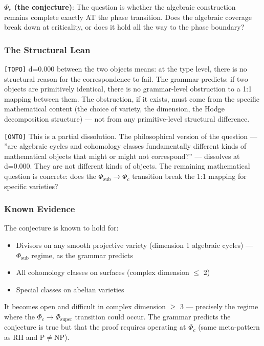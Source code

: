 \documentclass[12pt,a4paper]{article}
\begin{document}
\textbf{$\Phi_c$ (the conjecture)}: The question is whether the algebraic construction remains complete exactly AT the phase transition. Does the algebraic coverage break down at criticality, or does it hold all the way to the phase boundary?

\subsubsection{The Structural Lean}

\texttt{{[}TOPO{]}} d=0.000 between the two objects means: at the type level, there is no structural reason for the correspondence to fail. The grammar predicts: if two objects are primitively identical, there is no grammar-level obstruction to a 1:1 mapping between them. The obstruction, if it exists, must come from the specific mathematical content (the choice of variety, the dimension, the Hodge decomposition structure) --- not from any primitive-level structural difference.

\texttt{{[}ONTO{]}} This is a partial dissolution. The philosophical version of the question --- ''are algebraic cycles and cohomology classes fundamentally different kinds of mathematical objects that might or might not correspond?'' --- dissolves at d=0.000. They are not different kinds of objects. The remaining mathematical question is concrete: does the $\Phi_{\text{sub}} \to \Phi_c$ transition break the 1:1 mapping for specific varieties?

\subsubsection{Known Evidence}

The conjecture is known to hold for:

\begin{itemize}
    \item Divisors on any smooth projective variety (dimension 1 algebraic cycles) --- $\Phi_{\text{sub}}$ regime, as the grammar predicts
    \item All cohomology classes on surfaces (complex dimension $\le$ 2)
    \item Special classes on abelian varieties
\end{itemize}

It becomes open and difficult in complex dimension $\ge$ 3 --- precisely the regime where the $\Phi_c \to \Phi_{\text{super}}$ transition could occur. The grammar predicts the conjecture is true but that the proof requires operating at $\Phi_c$ (same meta-pattern as RH and P$\neq$NP).
\end{document}
